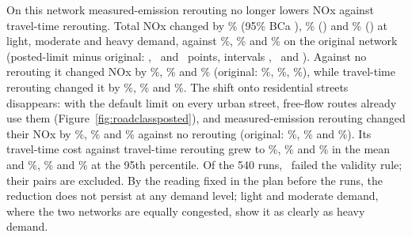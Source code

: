 \documentclass[11pt]{article}
\begin{document}
On this network measured-emission rerouting no longer lowers NOx against travel-time rerouting. Total NOx changed
by \SensEcoReactiveVsTtAdaptiveTotalNoxGLightPosted\% (95\% BCa \SensEcoReactiveVsTtAdaptiveTotalNoxGLightPostedCI),
\SensEcoReactiveVsTtAdaptiveTotalNoxGModeratePosted\% (\SensEcoReactiveVsTtAdaptiveTotalNoxGModeratePostedCI) and
\SensEcoReactiveVsTtAdaptiveTotalNoxGHeavyPosted\% (\SensEcoReactiveVsTtAdaptiveTotalNoxGHeavyPostedCI) at light,
moderate and heavy demand, against \SensEcoReactiveVsTtAdaptiveTotalNoxGLightOriginal\%,
\SensEcoReactiveVsTtAdaptiveTotalNoxGModerateOriginal\% and \SensEcoReactiveVsTtAdaptiveTotalNoxGHeavyOriginal\% on
the original network (posted-limit minus original: \SensEcoReactiveVsTtAdaptiveTotalNoxGLightDiff,
\SensEcoReactiveVsTtAdaptiveTotalNoxGModerateDiff\ and \SensEcoReactiveVsTtAdaptiveTotalNoxGHeavyDiff\ points, intervals
\SensEcoReactiveVsTtAdaptiveTotalNoxGLightDiffCI, \SensEcoReactiveVsTtAdaptiveTotalNoxGModerateDiffCI\ and
\SensEcoReactiveVsTtAdaptiveTotalNoxGHeavyDiffCI). Against no rerouting it changed NOx by
\SensEcoReactiveVsStaticTotalNoxGLightPosted\%, \SensEcoReactiveVsStaticTotalNoxGModeratePosted\% and
\SensEcoReactiveVsStaticTotalNoxGHeavyPosted\% (original: \SensEcoReactiveVsStaticTotalNoxGLightOriginal\%,
\SensEcoReactiveVsStaticTotalNoxGModerateOriginal\%, \SensEcoReactiveVsStaticTotalNoxGHeavyOriginal\%), while
travel-time rerouting changed it by \SensTtAdaptiveVsStaticTotalNoxGLightPosted\%,
\SensTtAdaptiveVsStaticTotalNoxGModeratePosted\% and \SensTtAdaptiveVsStaticTotalNoxGHeavyPosted\%. The shift onto
residential streets disappears: with the default limit on every urban street, free-flow routes already use them
(Figure~\ref{fig:roadclassposted}), and measured-emission rerouting changed their NOx by
\SensPostedEcoReactiveVsStaticNoxResidentialServicePctLight\%, \SensPostedEcoReactiveVsStaticNoxResidentialServicePctModerate\%
and \SensPostedEcoReactiveVsStaticNoxResidentialServicePctHeavy\% against no rerouting (original:
\SensOriginalEcoReactiveVsStaticNoxResidentialServicePctLight\%,
\SensOriginalEcoReactiveVsStaticNoxResidentialServicePctModerate\% and
\SensOriginalEcoReactiveVsStaticNoxResidentialServicePctHeavy\%). Its travel-time cost against travel-time rerouting
grew to \SensEcoReactiveVsTtAdaptiveMeanTtSLightPosted\%, \SensEcoReactiveVsTtAdaptiveMeanTtSModeratePosted\% and
\SensEcoReactiveVsTtAdaptiveMeanTtSHeavyPosted\% in the mean and \SensEcoReactiveVsTtAdaptivePNineFiveTtSLightPosted\%,
\SensEcoReactiveVsTtAdaptivePNineFiveTtSModeratePosted\% and \SensEcoReactiveVsTtAdaptivePNineFiveTtSHeavyPosted\% at
the 95th percentile. Of the 540 runs, \SensInvalidRuns\ failed the validity rule; their pairs are excluded. By the reading fixed
in the plan before the runs, the reduction does not persist at any demand level; light and moderate demand, where
the two networks are equally congested, show it as clearly as heavy demand.
\end{document}
